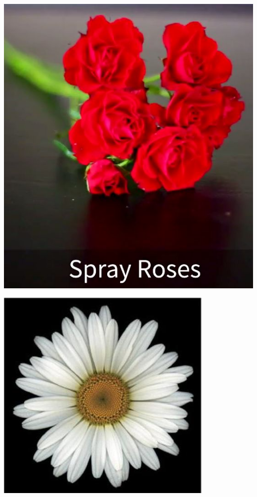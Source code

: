 \documentclass{article}
\begin{document}
\begin{center}
\includegraphics[height=0.9\textheight, angle=90]{../Rose_Spray.jpg}
\end{center}
\newpage

\begin{center}
\includegraphics[height=0.9\textheight, angle=90]{../ShastaDaisy.jpg}
\end{center}
\newpage
\end{document}
